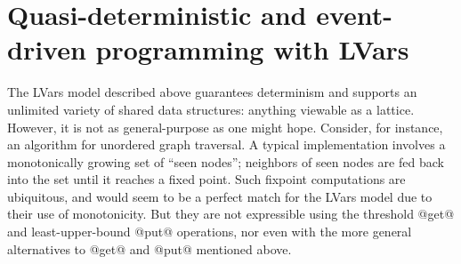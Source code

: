 \section{Quasi-deterministic and event-driven programming with LVars}\label{s:intro-quasi}

The LVars model described above guarantees determinism and supports an
unlimited variety of shared data structures: anything viewable as a
lattice.  However, it is not as general-purpose as one might hope.
Consider, for instance, an algorithm for unordered graph traversal.  A
typical implementation involves a monotonically growing set of ``seen
nodes''; neighbors of seen nodes are fed back into the set until it
reaches a fixed point.  Such fixpoint computations are ubiquitous, and
would seem to be a perfect match for the LVars model due to their use
of monotonicity.  But they are not expressible using the threshold
@get@ and least-upper-bound @put@ operations, nor even with the more
general alternatives to @get@ and @put@ mentioned above.

